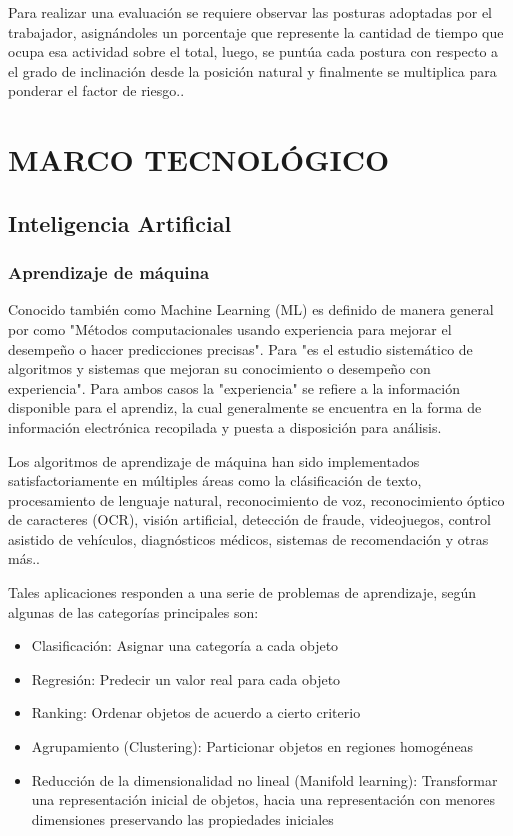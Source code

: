 Para realizar una evaluación se requiere observar las posturas adoptadas por el trabajador, asignándoles un porcentaje que represente la cantidad de tiempo que ocupa esa actividad sobre el total, luego, se puntúa cada postura con respecto a el grado de inclinación desde la posición natural y finalmente se multiplica para ponderar el factor de riesgo.\parencite{Nogareda2009TareasErgonomicos}.
\section{MARCO TECNOLÓGICO}
\subsection{Inteligencia Artificial}
\subsubsection{Aprendizaje de máquina}
Conocido también como Machine Learning (ML) es definido de manera general por \parencite{MehryarMohriAfshinRostamizadeh2012FoundationsLearning} como "Métodos computacionales usando experiencia para mejorar el desempeño o hacer predicciones precisas". Para \parencite{Flach2012MachineLearning} "es el estudio sistemático de algoritmos y sistemas
que mejoran su conocimiento o desempeño con experiencia". Para ambos casos la "experiencia" se refiere a la información disponible para el aprendiz, la cual generalmente se encuentra en la forma de información electrónica recopilada y puesta a disposición para análisis.

Los algoritmos de aprendizaje de máquina han sido implementados satisfactoriamente en múltiples áreas como la clásificación de texto, procesamiento de lenguaje natural, reconocimiento de voz, reconocimiento óptico de caracteres (OCR), visión artificial, detección de fraude, videojuegos, control asistido de vehículos, diagnósticos médicos, sistemas de recomendación y otras más.\parencite{MehryarMohriAfshinRostamizadeh2012FoundationsLearning}.

Tales aplicaciones responden a una serie de problemas de aprendizaje, según \parencite{MehryarMohriAfshinRostamizadeh2012FoundationsLearning} algunas de las categorías principales son:
\begin{itemize}
    \item Clasificación: Asignar una categoría a cada objeto
    \item Regresión: Predecir un valor real para cada objeto
    \item Ranking: Ordenar objetos de acuerdo a cierto criterio
    \item Agrupamiento (Clustering): Particionar objetos en regiones homogéneas
    \item Reducción de la dimensionalidad no lineal (Manifold learning): Transformar una representación inicial de objetos, hacia una representación con menores dimensiones preservando las propiedades iniciales
\end{itemize}

